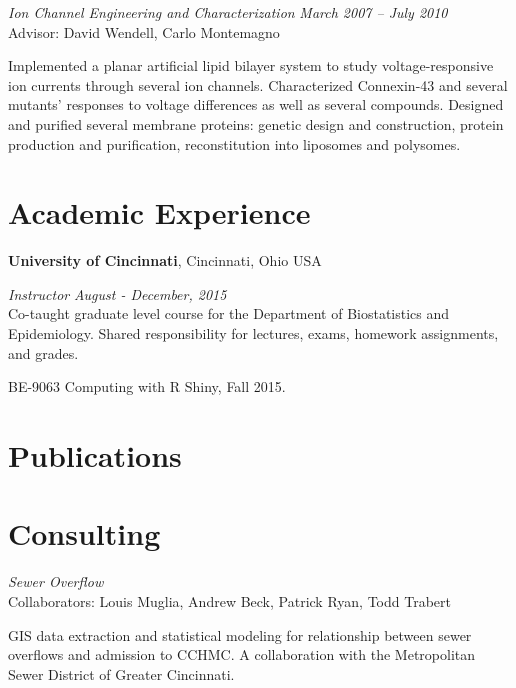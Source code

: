 \documentclass[margin,line]{res}
\newenvironment{list1}{
  \begin{list}{\ding{113}}{%
      \setlength{\itemsep}{0in}
      \setlength{\parsep}{0in} \setlength{\parskip}{0in}
      \setlength{\topsep}{0in} \setlength{\partopsep}{0in} 
      \setlength{\leftmargin}{0.17in}}}{\end{list}}
\newenvironment{list2}{
  \begin{list}{}{%
      \setlength{\itemsep}{0in}
      \setlength{\parsep}{0in} \setlength{\parskip}{0in}
      \setlength{\topsep}{0in} \setlength{\partopsep}{0in} 
      \setlength{\leftmargin}{0.4in}}}{\end{list}}
\begin{document}
\begin{resume}
\vspace{-0.2in}
\textsl{Ion Channel Engineering and Characterization}
\hfill \textit{March 2007 -- July 2010} \\ 
Advisor: David Wendell, Carlo Montemagno \\
\vspace{-0.13in}
\begin{list1}
\item[] Implemented a planar artificial lipid bilayer system to study voltage-responsive ion currents through several ion channels. Characterized Connexin-43 and several mutants' responses to voltage differences as well as several compounds. Designed and purified several membrane proteins: genetic design and construction, protein production and purification, reconstitution into liposomes and polysomes.
\end{list1}

\section{\sc Academic Experience}
{\bf University of Cincinnati}, Cincinnati, Ohio USA

{\em Instructor} \hfill \textit{August - December, 2015}\\
Co-taught graduate level course for the Department of Biostatistics and Epidemiology.  Shared responsibility for lectures, exams,
homework assignments, and  grades.  
\vspace*{.05in}  
\begin{list2}
\item BE-9063 Computing with R Shiny, Fall 2015.
\end{list2}



\section{\sc Publications}


\section{\sc Consulting}

\textsl{Sewer Overflow} \\
Collaborators:  Louis Muglia, Andrew Beck, Patrick Ryan, Todd Trabert\\
\vspace{-0.13in}
\begin{list1}
\item[] GIS data extraction and statistical modeling for relationship between sewer overflows and admission to CCHMC.  A collaboration with the Metropolitan Sewer District of Greater Cincinnati.
\end{list1}


\end{resume}
\end{document}
